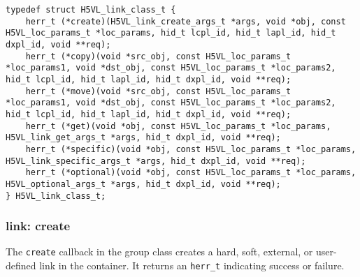 \begin{lstlisting}[caption={Structure for link callback routines, H5VLconnector.h}, captionpos=b, label={lst:H5Lclass}]
typedef struct H5VL_link_class_t {                                               
    herr_t (*create)(H5VL_link_create_args_t *args, void *obj, const H5VL_loc_params_t *loc_params, hid_t lcpl_id, hid_t lapl_id, hid_t dxpl_id, void **req);
    herr_t (*copy)(void *src_obj, const H5VL_loc_params_t *loc_params1, void *dst_obj, const H5VL_loc_params_t *loc_params2, hid_t lcpl_id, hid_t lapl_id, hid_t dxpl_id, void **req);           
    herr_t (*move)(void *src_obj, const H5VL_loc_params_t *loc_params1, void *dst_obj, const H5VL_loc_params_t *loc_params2, hid_t lcpl_id, hid_t lapl_id, hid_t dxpl_id, void **req);           
    herr_t (*get)(void *obj, const H5VL_loc_params_t *loc_params, H5VL_link_get_args_t *args, hid_t dxpl_id, void **req);                 
    herr_t (*specific)(void *obj, const H5VL_loc_params_t *loc_params, H5VL_link_specific_args_t *args, hid_t dxpl_id, void **req);            
    herr_t (*optional)(void *obj, const H5VL_loc_params_t *loc_params, H5VL_optional_args_t *args, hid_t dxpl_id, void **req); 
} H5VL_link_class_t;   
\end{lstlisting}


\subsubsection{link: create}
The \texttt{create} callback in the group class creates a hard,
soft, external, or user-defined link in the container. It returns an
\texttt{herr\_t} indicating success or failure.\bigskip

